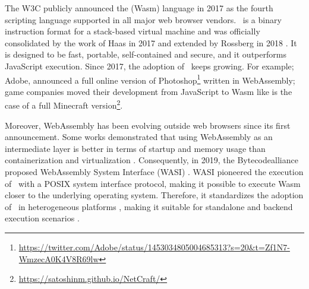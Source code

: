 \msection{\Wasm}
\label{sota:wasm}

The W3C publicly announced the \Wasm(Wasm) language in 2017 as the fourth scripting language supported in all major web browser vendors.
\wasm\ is a binary instruction format for a stack-based virtual machine and was officially consolidated by the work of Haas \etal \cite{Haas_2017} in 2017 and extended by Rossberg \etal in 2018 \cite{10.1145/3282510}. 
It is designed to be fast, portable, self-contained and secure, and it outperforms JavaScript execution. 
Since 2017, the adoption of \wasm\ keeps growing. 
For example; Adobe, announced a full online version of Photoshop\footnote{\url{https://twitter.com/Adobe/status/1453034805004685313?s=20&t=Zf1N7-WmzecA0K4V8R69lw}} written in WebAssembly;  game companies moved their development from JavaScript to Wasm like is the case of a full Minecraft version\footnote{\url{https://satoshinm.github.io/NetCraft/}}. 

Moreover, WebAssembly has been evolving outside web browsers since its first announcement.
Some works demonstrated that using WebAssembly as an intermediate layer is better in terms of startup and memory usage than containerization and virtualization \cite{pMendkiServerless, 1244493Jacobsson}. 
Consequently, in 2019, the Bytecodealliance proposed WebAssembly System Interface (WASI) \cite{WASI}. 
WASI pioneered the execution of \wasm\ with a POSIX system interface protocol, making it possible to execute Wasm closer to the underlying operating system. 
Therefore, it standardizes the adoption of \wasm\ in heterogeneous platforms \cite{bryant2020webassembly}, making it suitable for standalone and backend execution scenarios \cite{9640153, wen2020wasmachine}.


